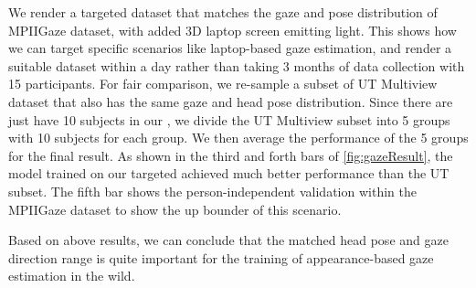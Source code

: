 We render a targeted \dataset dataset that matches the gaze and pose distribution of MPIIGaze dataset, with added 3D laptop screen emitting light. This shows how we can target specific scenarios like laptop-based gaze estimation, and render a suitable dataset within a day rather than taking 3 months of data collection with 15 participants. For fair comparison, we re-sample a subset of UT Multiview dataset that also has the same gaze and head pose distribution. Since there are just have 10 subjects in our \dataset, we divide the UT Multiview subset into 5 groups with 10 subjects for each group. We then average the performance of the 5 groups for the final result. As shown in the third and forth bars of \autoref{fig:gazeResult}, the model trained on our targeted \dataset achieved much better performance than the UT subset. The fifth bar shows the person-independent validation within the MPIIGaze dataset to show the up bounder of this scenario.

Based on above results, we can conclude that the matched head pose and gaze direction range is quite important for the training of appearance-based gaze estimation in the wild.





